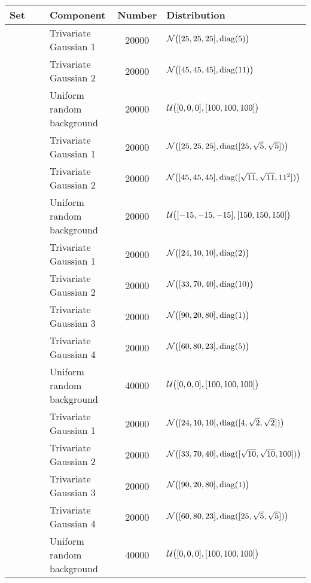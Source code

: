 
\begin{tabular}{@{}cclS[table-format=+1.1e+1,scientific-notation=true,round-mode=places,round-precision=1]l@{}}
\toprule
Set 			&~						& Component					& {Number} 	& Distribution\\
\midrule
\hline
\ferdosiTwo 	&\legendComponentOne	& Trivariate Gaussian 1		& 20000		& $\mathcal{N}\big([25, 25, 25], \operatorname{diag}(5)\big)$\\
~ 				&\legendComponentTwo	& Trivariate Gaussian 2		& 20000		& $\mathcal{N}\big([45, 45, 45], \operatorname{diag}(11)\big)$\\
~ 				&\legendComponentNoise	& Uniform random background	& 20000		& $\mathcal{U}\big([0, 0, 0], [100, 100, 100]\big)$\\
\hline
\baakmanTwo		&\legendComponentOne	& Trivariate Gaussian 1		& 20000		& $\mathcal{N}\big([25, 25, 25], \operatorname{diag}([25, \sqrt{5}, \sqrt{5}])\big)$\\
~ 				&\legendComponentTwo	& Trivariate Gaussian 2		& 20000		& $\mathcal{N}\big([45, 45, 45], \operatorname{diag}([\sqrt{11}, \sqrt{11}, 11^2])\big)$\\
~ 				&\legendComponentNoise	& Uniform random background	& 20000		& $\mathcal{U}\big([-15, -15, -15], [150, 150, 150]\big)$\\
\hline
\ferdosiThree	&\legendComponentOne 	& Trivariate Gaussian 1 	& 20000		& $\mathcal{N}\big([24, 10, 10], \operatorname{diag}(2)\big)$\\
~ 				&\legendComponentTwo	& Trivariate Gaussian 2 	& 20000		& $\mathcal{N}\big([33, 70, 40], \operatorname{diag}(10)\big)$\\
~ 				&\legendComponentThree	& Trivariate Gaussian 3 	& 20000		& $\mathcal{N}\big([90, 20, 80], \operatorname{diag}(1)\big)$\\
~ 				&\legendComponentFour	& Trivariate Gaussian 4 	& 20000		& $\mathcal{N}\big([60, 80, 23], \operatorname{diag}(5)\big)$\\
~ 				&\legendComponentNoise	& Uniform random background	& 40000		& $\mathcal{U}\big([0, 0, 0], [100, 100, 100]\big)$\\
\hline
\baakmanThree	&\legendComponentOne 	& Trivariate Gaussian 1 	& 20000		& $\mathcal{N}\big([24, 10, 10], \operatorname{diag}([4, \sqrt{2}, \sqrt{2}])\big)$\\
~ 				&\legendComponentTwo	& Trivariate Gaussian 2 	& 20000		& $\mathcal{N}\big([33, 70, 40], \operatorname{diag}([\sqrt{10}, \sqrt{10}, 100])\big)$\\
~ 				&\legendComponentThree	& Trivariate Gaussian 3 	& 20000		& $\mathcal{N}\big([90, 20, 80], \operatorname{diag}(1)\big)$\\
~ 				&\legendComponentFour	& Trivariate Gaussian 4 	& 20000		& $\mathcal{N}\big([60, 80, 23], \operatorname{diag}([25, \sqrt{5}, \sqrt{5}])\big)$\\
~ 				&\legendComponentNoise	& Uniform random background	& 40000		& $\mathcal{U}\big([0, 0, 0], [100, 100, 100]\big)$\\
\bottomrule
\end{tabular}
